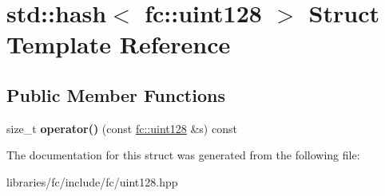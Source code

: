 \hypertarget{structstd_1_1hash_3_01fc_1_1uint128_01_4}{}\section{std\+:\+:hash$<$ fc\+:\+:uint128 $>$ Struct Template Reference}
\label{structstd_1_1hash_3_01fc_1_1uint128_01_4}
\subsection*{Public Member Functions}
\begin{DoxyCompactItemize}
\item 
\mbox{\label{structstd_1_1hash_3_01fc_1_1uint128_01_4_a665a62115f9796025842ff242475b020}} 
size\+\_\+t {\bfseries operator()} (const \mbox{\hyperlink{classfc_1_1uint128}{fc\+::uint128}} \&s) const
\end{DoxyCompactItemize}


The documentation for this struct was generated from the following file\+:\begin{DoxyCompactItemize}
\item 
libraries/fc/include/fc/uint128.\+hpp\end{DoxyCompactItemize}
